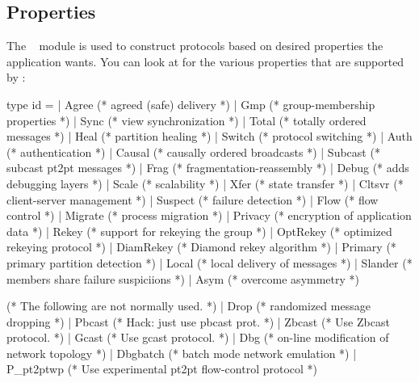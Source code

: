 %
%
%
\subsection{Properties}
\label{sec:properties}

The \ensemble\  module is used to construct protocols based on
desired properties the application wants.  You can look at 
for the various properties that are supported by \ensemble:
\begin{codebox}
type id =
  | Agree				(* agreed (safe) delivery *)
  | Gmp					(* group-membership properties *)
  | Sync				(* view synchronization *)
  | Total				(* totally ordered messages *)
  | Heal				(* partition healing *)
  | Switch				(* protocol switching *)
  | Auth				(* authentication *)
  | Causal				(* causally ordered broadcasts *)
  | Subcast				(* subcast pt2pt messages *)
  | Frag				(* fragmentation-reassembly *)
  | Debug				(* adds debugging layers *)
  | Scale				(* scalability *)
  | Xfer				(* state transfer *)
  | Cltsvr				(* client-server management *)
  | Suspect				(* failure detection *)
  | Flow				(* flow control *)
  | Migrate				(* process migration *)
  | Privacy				(* encryption of application data *)
  | Rekey				(* support for rekeying the group *)
  | OptRekey				(* optimized rekeying protocol *)
  | DiamRekey                           (* Diamond rekey algorithm *)
  | Primary				(* primary partition detection *)
  | Local				(* local delivery of messages *)
  | Slander				(* members share failure suspiciions *)
  | Asym			        (* overcome asymmetry *)

    (* The following are not normally used.
     *)
  | Drop				(* randomized message dropping *)
  | Pbcast				(* Hack: just use pbcast prot. *)
  | Zbcast                              (* Use Zbcast protocol. *)
  | Gcast                               (* Use gcast protocol. *)
  | Dbg                                 (* on-line modification of network topology *)
  | Dbgbatch                            (* batch mode network emulation *)
  | P_pt2ptwp                           (* Use experimental pt2pt flow-control protocol *)
\end{codebox}

